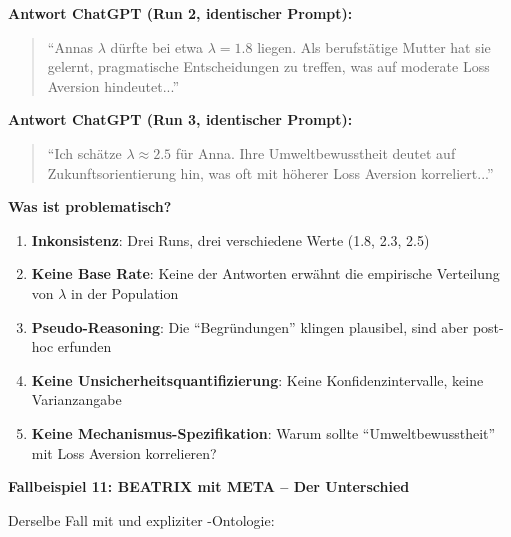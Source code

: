 \textbf{Antwort ChatGPT (Run 2, identischer Prompt):}
\begin{quote}
``Annas $\lambda$ dürfte bei etwa $\lambda = 1.8$ liegen. Als berufstätige Mutter hat sie gelernt, pragmatische Entscheidungen zu treffen, was auf moderate Loss Aversion hindeutet...''
\end{quote}

\textbf{Antwort ChatGPT (Run 3, identischer Prompt):}
\begin{quote}
``Ich schätze $\lambda \approx 2.5$ für Anna. Ihre Umweltbewusstheit deutet auf Zukunftsorientierung hin, was oft mit höherer Loss Aversion korreliert...''
\end{quote}

\textbf{Was ist problematisch?}
\begin{enumerate}
    \item \textbf{Inkonsistenz}: Drei Runs, drei verschiedene Werte (1.8, 2.3, 2.5)
    \item \textbf{Keine Base Rate}: Keine der Antworten erwähnt die empirische Verteilung von $\lambda$ in der Population
    \item \textbf{Pseudo-Reasoning}: Die ``Begründungen'' klingen plausibel, sind aber post-hoc erfunden
    \item \textbf{Keine Unsicherheitsquantifizierung}: Keine Konfidenzintervalle, keine Varianzangabe
    \item \textbf{Keine Mechanismus-Spezifikation}: Warum sollte ``Umweltbewusstheit'' mit Loss Aversion korrelieren?
\end{enumerate}

\textbf{Fallbeispiel 11: BEATRIX mit META -- Der Unterschied}

Derselbe Fall mit \BEATRIX{} und expliziter \META-Ontologie:

